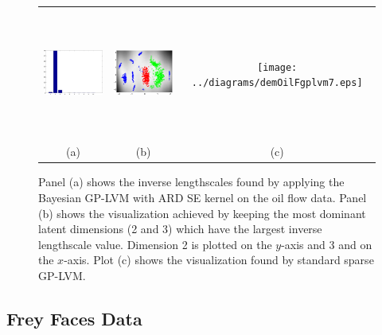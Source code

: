\documentclass[twoside,times]{article}
\begin{document}
\begin{figure}[ht]
\begin{center}
\begin{tabular}{ccc}
\includegraphics[width=50mm,height=42.5mm]
{../diagrams/demOilVargplvmLengthScales1}&
\includegraphics[width=50mm,height=42.5mm]
{../diagrams/demOilVargplvm1} &
\texttt{[image: ../diagrams/demOilFgplvm7.eps]}\\
(a) & (b) & (c)
\end{tabular}
\caption{Panel (a) shows the inverse lengthscales found by applying the
  Bayesian GP-LVM with ARD SE kernel on the oil flow data. Panel (b)
  shows the visualization achieved by keeping the most dominant latent
  dimensions (2 and 3) which have the largest inverse lengthscale
  value. Dimension 2 is plotted on the
  $y$-axis and 3 and on the $x$-axis. Plot (c) shows the visualization found
  by standard sparse GP-LVM.
\label{fig:Oil}}
\end{center}
\end{figure}

\vspace{-2mm}
\subsection{Frey Faces Data}
\vspace{-2mm}
\end{document}
